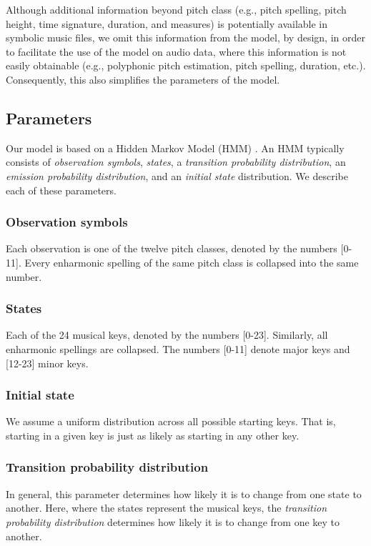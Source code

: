 \documentclass[sigconf]{acmart}
\begin{document}
Although additional information beyond pitch class (e.g., pitch spelling, pitch height, time signature, duration, and measures) is potentially available in symbolic music files, we omit this information from the model, by design, in order to facilitate the use of the model on audio data, where this information is not easily obtainable (e.g., polyphonic pitch estimation, pitch spelling, duration, etc.). Consequently, this also simplifies the parameters of the model.

\subsection{Parameters}
Our model is based on a Hidden Markov Model (HMM) \cite{rabiner1986introduction}. An HMM typically consists of \emph{observation symbols}, \emph{states}, a \emph{transition probability distribution}, an \emph{emission probability distribution}, and an \emph{initial state} distribution. We describe each of these parameters.

\subsubsection{Observation symbols}
Each observation is one of the twelve pitch classes, denoted by the numbers [0-11]. Every enharmonic spelling of the same pitch class is collapsed into the same number.

\subsubsection{States}
Each of the 24 musical keys, denoted by the numbers [0-23]. Similarly, all enharmonic spellings are collapsed. The numbers [0-11] denote major keys and [12-23] minor keys.

\subsubsection{Initial state}
We assume a uniform distribution across all possible starting keys. That is, starting in a given key is just as likely as starting in any other key.

\subsubsection{Transition probability distribution}
In general, this parameter determines how likely it is to change from one state to another. Here, where the states represent the musical keys, the \emph{transition probability distribution} determines how likely it is to change from one key to another.
\end{document}
